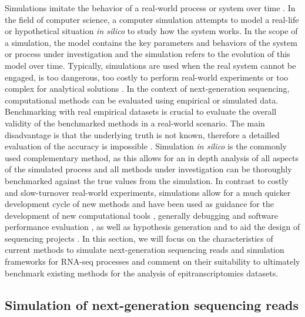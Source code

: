 Simulations imitate the behavior of a real-world process or system over time \citep{Banks2004DiscreteEvent}. In the field of computer science, a computer simulation attempts to model a real-life or hypothetical situation \textit{in silico} to study how the system works. In the scope of a simulation, the model contains the key parameters and behaviors of the system or process under investigation and the simulation refers to the evolution of this model over time. Typically, simulations are used when the real system cannot be engaged, is too dangerous, too costly to perform real-world experiments or too complex for analytical solutions \citep{nla.cat-vn3969224}. In the context of next-generation sequencing, computational methods can be evaluated using empirical or simulated data. Benchmarking with real empirical datasets is crucial to evaluate the overall validity of the benchmarked methods in a real-world scenario. The main disadvantage is that the underlying truth is not known, therefore a detailled evaluation of the accuracy is impossible \citep{Escalona2016}. Simulation \textit{in silico} is the commonly used complementary method, as this allows for an in depth analysis of all aspects of the simulated process and all methods under investigation can be thoroughly benchmarked against the true values from the simulation. In contrast to costly and slow-turnover real-world experiments, simulations allow for a much quicker development cycle of new methods \citep{Zhao2017} and have been used as guidance for the development of new computational tools \citep{Huang2012}, generally debugging and software performance evaluation \citep{Hu2012,Caboche2014}, as well as hypothesis generation \citep{Hoban2012} and to aid the design of sequencing projects \citep{Shendure2012,Shcherbina2014}. In this section, we will focus on the characteristics of current methods to simulate next-generation sequencing reads and simulation frameworks for RNA-seq processes and comment on their suitability to ultimately benchmark existing methods for the analysis of epitranscriptomics datasets.

\subsection{Simulation of next-generation sequencing reads}

